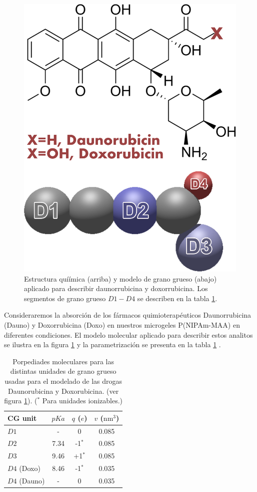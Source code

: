 \begin{figure}[!tb]
\centering
\includegraphics[width=0.35\linewidth]{Figures/graph-gel/dauno-doxo.png}
\caption{Estructura quí\'imica (arriba) y modelo de grano grueso (abajo) aplicado para describir daunorrubicina y doxorrubicina.
	Los segmentos de grano grueso $D1-D4$ se describen en la tabla \ref{table:gel:drugs}.}
\label{fig:gel:dauno-doxo}
\end{figure}


Consideraremos la absorci\'on de los f\'armacos quimioterap\'euticos Daunorrubicina (Dauno) y Doxorrubicina (Doxo) en nuestros microgeles P(NIPAm-MAA) en diferentes condiciones.
El modelo molecular aplicado para describir estos analitos se ilustra en la figura \ref{fig:gel:dauno-doxo} y la parametrizaci\'on se presenta en la tabla \ref{table:gel:drugs} \cite{PerezChavez2020}.

\begin{table}
\centering
\begin{tabular}{|lccc|}
    \hline
    {CG unit} & {$pKa$} & {$q$ ($e$)} & {$v$ ($\text{nm}^3$)} \\
      \hline
$D1$ & - & 0 & 0.085\\
$D2$ & 7.34 & -1$^\ast$ & 0.085\\
$D3$ & 9.46 & +1$^\ast$ & 0.085\\ 
$D4$ (Doxo) & 8.46 & -1$^\ast$ & 0.035\\
$D4$ (Dauno) & - & 0 & 0.035 \\
    \hline
  \end{tabular}
 \caption{Porpediades moleculares para las distintas unidades de grano grueso usadas para el modelado de las drogas Daunorubicina y Doxorubicina. (ver figura \ref{fig:gel:dauno-doxo}).
\footnotesize ($^\ast$ Para unidades ionizables.)}
\label{table:gel:drugs} 
\end{table}





